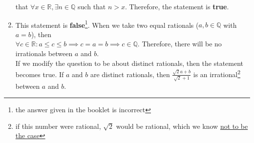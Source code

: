 \documentclass{article}
\begin{document}
\begin{enumerate}
	that $\forall x \in \mathbb{R}, \exists n \in \mathbb{Q}$ such that $n > x$. Therefore, the statement is \textbf{true}.
	\item This statement is \textbf{false}\footnote[4]{the answer given in the booklet is incorrect}. When we take two equal rationals ($a, b \in \mathbb{Q}$ with $a = b$), then\\ $\forall c \in \mathbb{R}: a \leq c \leq b \implies c = a = b \implies c \in \mathbb{Q}$. Therefore, there will be no irrationals between $a$ and $b$.
	\\If we modify the question to be about distinct rationals, then the statement becomes true. If $a$ and $b$ are distinct rationals, then $\frac{\sqrt{2}a + b}{\sqrt{2}+1}$ is an irrational\footnote[5]{if this number were rational, $\sqrt{2}$ would be rational, which we know \href{https://proofwiki.org/wiki/Square_Root_of_2_is_Irrational}{not to be the case}} between $a$ and $b$.
\end{enumerate}
\end{document}
